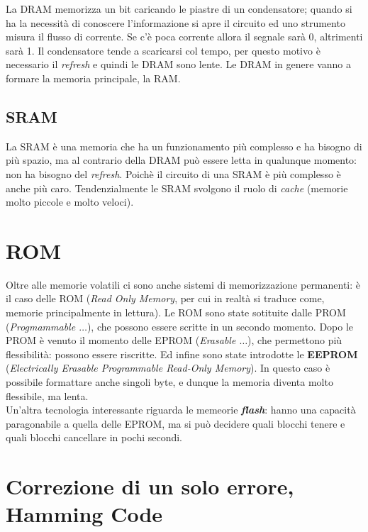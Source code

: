 \documentclass{article}
\begin{document}
La DRAM memorizza un bit caricando le piastre di un condensatore; quando si ha la necessità di conoscere l'informazione si apre il circuito ed uno strumento misura il flusso di corrente. Se c'è poca corrente allora il segnale sarà 0, altrimenti sarà 1. Il condensatore tende a scaricarsi col tempo, per questo motivo è necessario il \textit{refresh} e quindi le DRAM sono lente. Le DRAM in genere vanno a formare la memoria principale, la RAM.

\subsection{SRAM}\label{sram}

La SRAM è una memoria che ha un funzionamento più complesso e ha bisogno di più spazio, ma al contrario della DRAM può essere letta in qualunque momento: non ha bisogno del \textit{refresh}. Poichè il circuito di una SRAM è più complesso è anche più caro. Tendenzialmente le SRAM svolgono il ruolo di \textit{cache} (memorie molto piccole e molto veloci).

\section{ROM}

Oltre alle memorie volatili ci sono anche sistemi di memorizzazione permanenti: è il caso delle ROM (\textit{Read Only Memory}, per cui in realtà si traduce come, memorie principalmente in lettura). Le ROM sono state sotituite dalle PROM (\textit{Progmammable $\dots$}), che possono essere scritte in un secondo momento. Dopo le PROM è venuto il momento delle EPROM (\textit{Erasable $\dots$}), che permettono più flessibilità: possono essere riscritte. Ed infine sono state introdotte le \textbf{EEPROM} (\textit{Electrically Erasable Programmable Read-Only Memory}). In questo caso è possibile formattare anche singoli byte, e dunque la memoria diventa molto flessibile, ma lenta.\\

Un'altra tecnologia interessante riguarda le memeorie \textit{\textbf{flash}}: hanno una capacità paragonabile a quella delle EPROM, ma si può decidere quali blocchi tenere e quali blocchi cancellare in pochi secondi.

\section{Correzione di un solo errore, Hamming Code}
\label{hammingcode}
\end{document}
